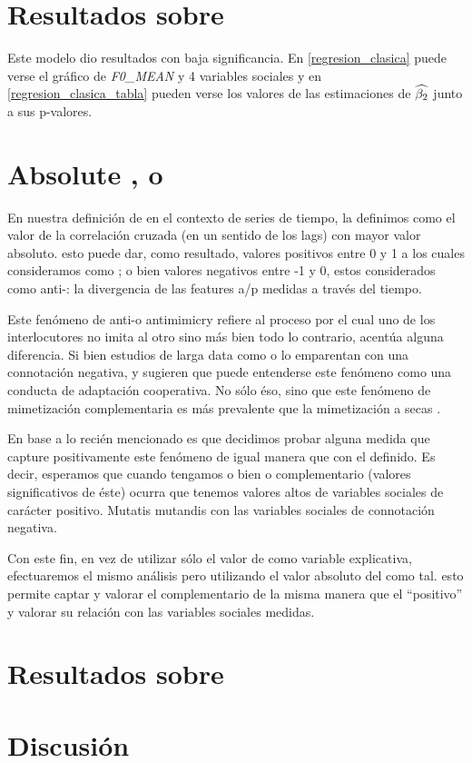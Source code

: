 \section{Resultados sobre \entrainment}

Este modelo dio resultados con baja significancia. En \ref{regresion_clasica} puede verse el gráfico de \emph{F0\_MEAN} y 4 variables sociales y en \ref{regresion_clasica_tabla} pueden verse los valores de las estimaciones de $\widehat{\beta_2}$ junto a sus p-valores.



\section{Absolute \entrainment, o \disentrainment}

En nuestra definición de \entrainment en el contexto de series de tiempo, la definimos como el valor de la correlación cruzada (en un sentido de los lags) con mayor valor absoluto. esto puede dar, como resultado, valores positivos entre 0 y 1 a los cuales consideramos como \entrainment; o bien valores negativos entre -1 y 0, estos considerados como anti-\entrainment: la divergencia de las features a/p medidas a través del tiempo.

Este fenómeno de anti-\entrainment o antimimicry \cite{CHAR1999} refiere al proceso por el cual uno de los interlocutores no imita al otro sino más bien todo lo contrario, acentúa alguna diferencia. Si bien estudios de larga data como \cite{bourhis1973language} o \cite{dabbs1969similarity} lo emparentan con una connotación negativa, \cite{healey2014divergence} y \cite{levitan2015acoustic} sugieren que puede entenderse este fenómeno como una conducta de adaptación cooperativa. No sólo éso, sino que este fenómeno de mimetización complementaria es más prevalente que la mimetización a secas \cite{levitan2015acoustic}.

En base a lo recién mencionado es que decidimos probar alguna medida que capture positivamente este fenómeno de igual manera que con el \entrainment definido. Es decir, esperamos que cuando tengamos o bien \entrainment o \entrainment complementario (valores significativos de éste) ocurra que tenemos valores altos de variables sociales de carácter positivo. Mutatis mutandis con las variables sociales de connotación negativa.

Con este fin, en vez de utilizar sólo el valor de \entrainment como variable explicativa, efectuaremos el mismo análisis pero utilizando el valor absoluto del \entrainment como tal. esto permite captar y valorar el \entrainment complementario de la misma manera que el ``positivo'' y valorar su relación con las variables sociales medidas.

\section{Resultados sobre \absentrainment}


\section{Discusión}

